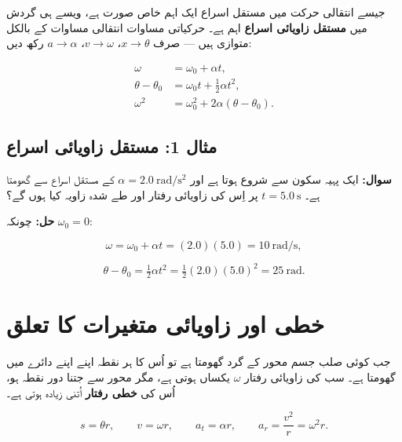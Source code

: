 \documentclass{urdu-textbook}
\begin{document}
جیسے انتقالی حرکت میں مستقل اسراع ایک اہم خاص صورت ہے، ویسے ہی گردش میں
\textbf{مستقل زاویائی اسراع} اہم ہے۔ حرکیاتی مساوات انتقالی مساوات کے
بالکل متوازی ہیں --- صرف \(x \to \theta\)، \(v \to \omega\)،
\(a \to \alpha\) رکھ دیں:

\[\begin{aligned}
\omega &= \omega_0 + \alpha t,\\
\theta - \theta_0 &= \omega_0 t + \tfrac{1}{2}\alpha t^2,\\
\omega^2 &= \omega_0^2 + 2\alpha(\theta-\theta_0).
\end{aligned}\]

\hypertarget{ux645ux62bux627ux644-1-ux645ux633ux62aux642ux644-ux632ux627ux648ux6ccux627ux626ux6cc-ux627ux633ux631ux627ux639}{%
\subsection{مثال 1: مستقل زاویائی
اسراع}\label{ux645ux62bux627ux644-1-ux645ux633ux62aux642ux644-ux632ux627ux648ux6ccux627ux626ux6cc-ux627ux633ux631ux627ux639}}

\textbf{سوال:} ایک پہیہ سکون سے شروع ہوتا ہے اور
\(\alpha = 2.0\ \mathrm{rad/s^2}\) کے مستقل اسراع سے گھومتا ہے۔
\(t = 5.0\ \mathrm{s}\) پر اِس کی زاویائی رفتار اور طے شدہ زاویہ کیا ہوں
گے؟

\textbf{حل:} چونکہ \(\omega_0 = 0\):

\[\omega = \omega_0 + \alpha t = (2.0)(5.0) = 10\ \mathrm{rad/s},\]

\[\theta - \theta_0 = \tfrac{1}{2}\alpha t^2 = \tfrac{1}{2}(2.0)(5.0)^2 = 25\ \mathrm{rad}.\]

\hypertarget{ux62eux637ux6cc-ux627ux648ux631-ux632ux627ux648ux6ccux627ux626ux6cc-ux645ux62aux63aux6ccux631ux627ux62a-ux6a9ux627-ux62aux639ux644ux642}{%
\section{خطی اور زاویائی متغیرات کا
تعلق}\label{ux62eux637ux6cc-ux627ux648ux631-ux632ux627ux648ux6ccux627ux626ux6cc-ux645ux62aux63aux6ccux631ux627ux62a-ux6a9ux627-ux62aux639ux644ux642}}

جب کوئی صلب جسم محور کے گرد گھومتا ہے تو اُس کا ہر نقطہ اپنے اپنے دائرے
میں گھومتا ہے۔ سب کی زاویائی رفتار \(\omega\) یکساں ہوتی ہے، مگر محور سے
جتنا دور نقطہ ہو، اُس کی \textbf{خطی رفتار} اُتنی زیادہ ہوتی ہے۔

\[s = \theta r, \qquad v = \omega r, \qquad a_t = \alpha r, \qquad a_r = \frac{v^2}{r} = \omega^2 r.\]
\end{document}
